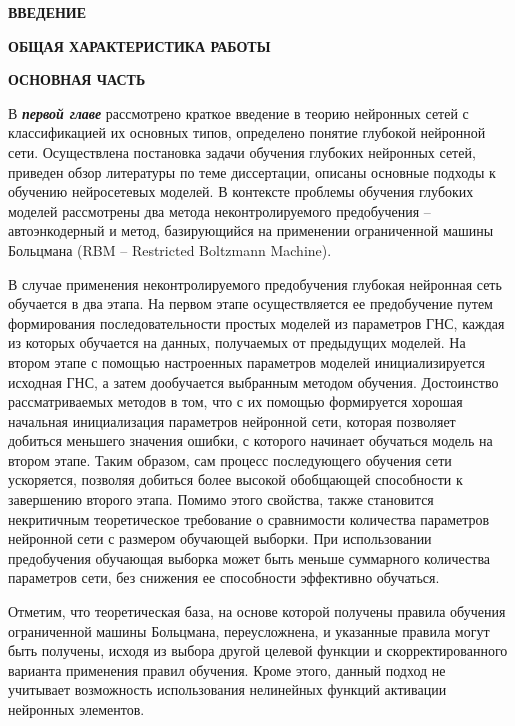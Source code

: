 \documentclass{thesisby}
\begin{document}
\vspace*{\fill}

\vspace*{\fill}

\newpage
\setcounter{page}{1}

\centerline{\bf ВВЕДЕНИЕ}

\parindent=1cm

\medskip


\bigskip
\newpage
\centerline{\bf ОБЩАЯ ХАРАКТЕРИСТИКА РАБОТЫ}
\medskip


\bigskip
\centerline{\bf ОСНОВНАЯ ЧАСТЬ}\medskip
В \textbf{\textit{первой главе}} рассмотрено краткое введение в теорию нейронных сетей с классификацией их основных типов, определено понятие глубокой нейронной сети. Осуществлена постановка задачи обучения глубоких нейронных сетей, приведен обзор литературы по теме диссертации, описаны основные подходы к обучению нейросетевых моделей. В контексте проблемы обучения глубоких моделей рассмотрены два метода неконтролируемого предобучения -- автоэнкодерный и метод, базирующийся на применении ограниченной машины Больцмана (RBM -- Restricted Boltzmann Machine). 

В случае применения неконтролируемого предобучения глубокая нейронная сеть обучается в два этапа. На первом этапе осуществляется ее предобучение путем формирования последовательности простых моделей из параметров ГНС, каждая из которых обучается на данных, получаемых от предыдущих моделей. На втором этапе с помощью настроенных параметров моделей инициализируется исходная ГНС, а затем дообучается выбранным методом обучения. 
Достоинство рассматриваемых методов в том, что с их помощью формируется хорошая начальная инициализация параметров нейронной сети, которая позволяет добиться меньшего значения ошибки, с которого начинает обучаться модель на втором этапе. Таким образом, сам процесс последующего обучения сети ускоряется, позволяя добиться более высокой обобщающей способности к завершению второго этапа. Помимо этого свойства, также становится некритичным теоретическое требование о сравнимости количества параметров нейронной сети с размером обучающей выборки. При использовании предобучения обучающая выборка может быть меньше суммарного количества параметров сети, без снижения ее способности эффективно обучаться.

Отметим, что теоретическая база, на основе которой получены правила обучения ограниченной машины Больцмана, переусложнена, и указанные правила могут быть получены, исходя из выбора другой целевой функции и скорректированного варианта применения правил обучения. Кроме этого, данный подход не учитывает возможность использования нелинейных функций активации нейронных элементов.
\end{document}
